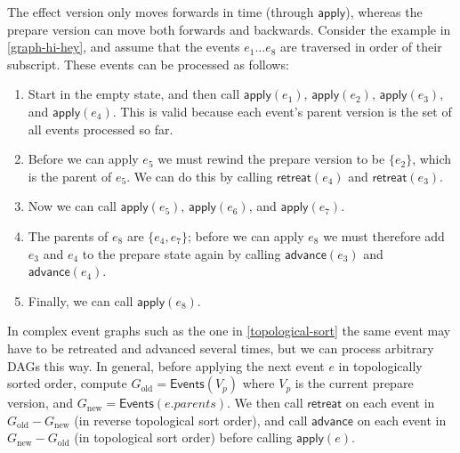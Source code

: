 \documentclass[sigplan,10pt]{acmart}
\begin{document}
The effect version only moves forwards in time (through $\mathsf{apply}$), whereas the prepare version can move both forwards and backwards.
Consider the example in \autoref{graph-hi-hey}, and assume that the events $e_1 \dots e_8$ are traversed in order of their subscript.
These events can be processed as follows:

\begin{enumerate}
\item Start in the empty state, and then call $\mathsf{apply}(e_1)$, $\mathsf{apply}(e_2)$, $\mathsf{apply}(e_3)$, and $\mathsf{apply}(e_4)$. This is valid because each event's parent version is the set of all events processed so far.
\item Before we can apply $e_5$ we must rewind the prepare version to be $\{e_2\}$, which is the parent of $e_5$. We can do this by calling $\mathsf{retreat}(e_4)$ and $\mathsf{retreat}(e_3)$.
\item Now we can call $\mathsf{apply}(e_5)$, $\mathsf{apply}(e_6)$, and $\mathsf{apply}(e_7)$.
\item The parents of $e_8$ are $\{e_4, e_7\}$; before we can apply $e_8$ we must therefore add $e_3$ and $e_4$ to the prepare state again by calling $\mathsf{advance}(e_3)$ and $\mathsf{advance}(e_4)$.
\item Finally, we can call $\mathsf{apply}(e_8)$.
\end{enumerate}

In complex event graphs such as the one in \autoref{topological-sort} the same event may have to be retreated and advanced several times, but we can process arbitrary DAGs this way.
In general, before applying the next event $e$ in topologically sorted order, compute $G_\mathrm{old} = \mathsf{Events}(V_p)$ where $V_p$ is the current prepare version, and $G_\mathrm{new} = \mathsf{Events}(e.\mathit{parents})$.
We then call $\mathsf{retreat}$ on each event in $G_\mathrm{old} - G_\mathrm{new}$ (in reverse topological sort order), and call $\mathsf{advance}$ on each event in $G_\mathrm{new} - G_\mathrm{old}$ (in topological sort order) before calling $\mathsf{apply}(e)$.

\end{document}
